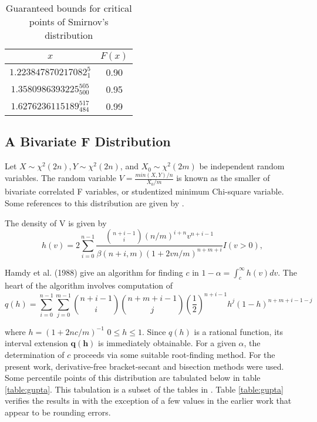 \begin{table}[ht!]
\caption{\label{table:gof2} Guaranteed bounds for critical points of
Smirnov's distribution }
\begin{center}
\renewcommand{\arraystretch}{1.3}
\begin{tabular}{c|c}
$x$ & $F(x)$ \\ \hline 
$1.223847870217082^5_1$ & 0.90 \\
$1.3580986393225^{505}_{500}$ & 0.95 \\
$1.6276236115189^{ 517}_{484}$ &  0.99 
\end{tabular}
\end{center}
\end{table}

\subsection{A Bivariate F Distribution }

Let $X \sim \chi^2(2n), Y \sim \chi^2(2n)$, and $X_0 \sim \chi^2(2m)$ 
be independent random variables. 
The random variable $V = \frac{min(X,Y)/n}{X_0/m}$
is known as the smaller of bivariate correlated F 
variables, or studentized minimum Chi-square variable. Some references to this
distribution are given by \cite{Hamdy}. 

The density of V is given by 
\begin{equation}
\label{eqn:bivf0}
h(v)=2\sum_{i=0}^{n-1} \frac{ {n+i-1 \choose i} (n/m)^{i+n}v^{n+i-1}}
  {\beta(n+i,m)(1+2vn/m)^{n+m+i}}I(v>0),
\end{equation}

Hamdy et al. (1988) give an algorithm for finding $c$ in 
$1-\alpha = \int_c^\infty h(v)dv$.  The heart
of the algorithm involves computation of 
\begin{equation}
q(h) = \sum_{i=0}^{n-1} \sum_{j=0}^{m-1}{n+i-1 \choose i}{n+m+i-1 \choose j}
    \left( \frac{1}{2} \right)^{n+i-1} h^j(1-h)^{n+m+i-1-j}
\end{equation}

where $h = (1 + 2nc/m)^{-1}$ $0 \leq h \leq 1$. Since 
$q(h)$ is a rational function, its interval 
extension $\mathbf{q}(\mathbf{h})$ is immediately obtainable. 
For a given $\alpha$, the determination of $c$ proceeds 
via some suitable root-finding method. For the present work, derivative-free
bracket-secant and bisection methods were used. Some percentile points of
this distribution are  
tabulated below in table \ref{table:gupta}. 
This tabulation is a subset of the tables in 
\cite{GuptaSobel}.
Table \ref{table:gupta} 
verifies the results in \cite{GuptaSobel} with the exception of a 
few values in the earlier work that appear to be rounding errors. 


